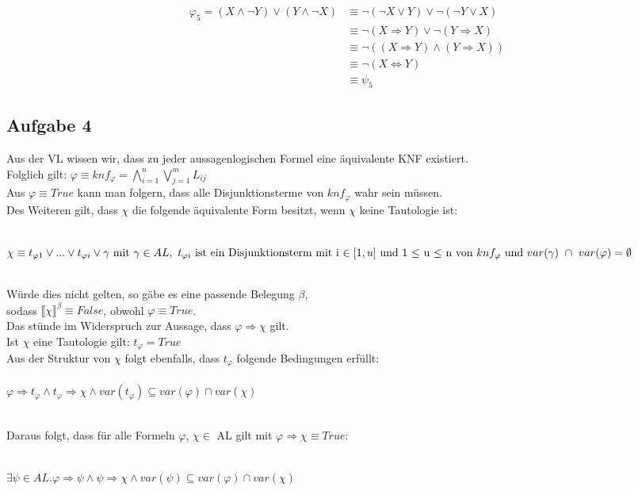 \documentclass[a4paper,10pt]{article}
\begin{document}
	\begin{align*}
	\varphi_5 = (X \wedge\neg Y) \vee (Y \wedge \neg X) 
	&\equiv \neg (\neg X \vee Y) \vee \neg (\neg Y \vee X) \\
	&\equiv \neg (X \Rightarrow Y) \vee \neg (Y \Rightarrow X) \\
	&\equiv \neg ((X \Rightarrow Y) \wedge (Y \Rightarrow X)) \\
	&\equiv \neg (X \Leftrightarrow Y) \\
	&\equiv \psi_5 
	\end{align*}
	
	\subsection*{Aufgabe 4}
	Aus der VL wissen wir, dass zu jeder aussagenlogischen Formel eine äquivalente KNF existiert. \\
	Folglich gilt: $\varphi \equiv knf_{\varphi} = \bigwedge\limits_{i=1}^{n} \bigvee\limits_{j=1}^{m} L_{ij}$ \\
	Aus $\varphi \equiv True$ kann man folgern, dass alle Disjunktionsterme von $knf_{\varphi}$ wahr sein müssen.\\
	Des Weiteren gilt, dass $\chi$ die folgende äquivalente Form besitzt, wenn $\chi$ keine Tautologie ist:
	
	\ \\ \( \chi \equiv t_{\varphi 1} \vee ... \vee  t_{\varphi i} \vee \gamma \text{ mit } \\
	\gamma \in AL,~t_{\varphi i} \text{ ist ein Disjunktionsterm
	mit i $\in [1,u]$ und 1 $\leq$ u $\leq$ n von } \\ 
	knf_{\varphi} \text{ und } var(\gamma) ~\cap~ var(\varphi) = \emptyset \)
	
	\ \\Würde dies nicht gelten, so gäbe es eine passende Belegung $\beta$, \\
	sodass $\llbracket \chi \rrbracket ^\beta \equiv False$, obwohl $\varphi \equiv True$. \\
	Das stünde im Widerspruch zur Aussage, dass $\varphi \Rightarrow \chi$ gilt. \\
	Ist $\chi$ eine Tautologie gilt: $t_{\varphi} = True$ \\
	Aus der Struktur von $\chi$ folgt ebenfalls, dass $t_{\varphi}$ folgende Bedingungen erfüllt:\\
	\ \\ \(\varphi \Rightarrow t_{\varphi} \wedge t_{\varphi} \Rightarrow \chi \wedge var(t_{\varphi}) \subseteq 		  	var(\varphi) \cap var(\chi) \)
	
	\ \\Daraus folgt, dass für alle Formeln $\varphi$, $\chi \in$ AL gilt mit $\varphi \Rightarrow \chi \equiv True$:
	
	\ \\ \( \exists \psi \in AL. \varphi \Rightarrow \psi \wedge 
	\psi \Rightarrow \chi \wedge var(\psi) \subseteq var(\varphi) \cap var(\chi) \)
\end{document}
